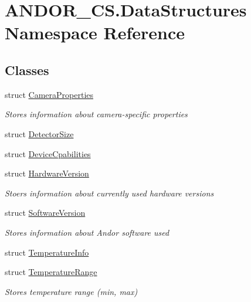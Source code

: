 \hypertarget{namespace_a_n_d_o_r___c_s_1_1_data_structures}{}\section{A\+N\+D\+O\+R\+\_\+\+C\+S.\+Data\+Structures Namespace Reference}
\label{namespace_a_n_d_o_r___c_s_1_1_data_structures}
\subsection*{Classes}
\begin{DoxyCompactItemize}
\item 
struct \hyperlink{struct_a_n_d_o_r___c_s_1_1_data_structures_1_1_camera_properties}{Camera\+Properties}
\begin{DoxyCompactList}\small\item\em Stores information about camera-\/specific properties \end{DoxyCompactList}\item 
struct \hyperlink{struct_a_n_d_o_r___c_s_1_1_data_structures_1_1_detector_size}{Detector\+Size}
\item 
struct \hyperlink{struct_a_n_d_o_r___c_s_1_1_data_structures_1_1_device_cpabilities}{Device\+Cpabilities}
\item 
struct \hyperlink{struct_a_n_d_o_r___c_s_1_1_data_structures_1_1_hardware_version}{Hardware\+Version}
\begin{DoxyCompactList}\small\item\em Stoers information about currently used hardware versions \end{DoxyCompactList}\item 
struct \hyperlink{struct_a_n_d_o_r___c_s_1_1_data_structures_1_1_software_version}{Software\+Version}
\begin{DoxyCompactList}\small\item\em Stores information about Andor software used \end{DoxyCompactList}\item 
struct \hyperlink{struct_a_n_d_o_r___c_s_1_1_data_structures_1_1_temperature_info}{Temperature\+Info}
\item 
struct \hyperlink{struct_a_n_d_o_r___c_s_1_1_data_structures_1_1_temperature_range}{Temperature\+Range}
\begin{DoxyCompactList}\small\item\em Stores temperature range (min, max) \end{DoxyCompactList}\end{DoxyCompactItemize}

